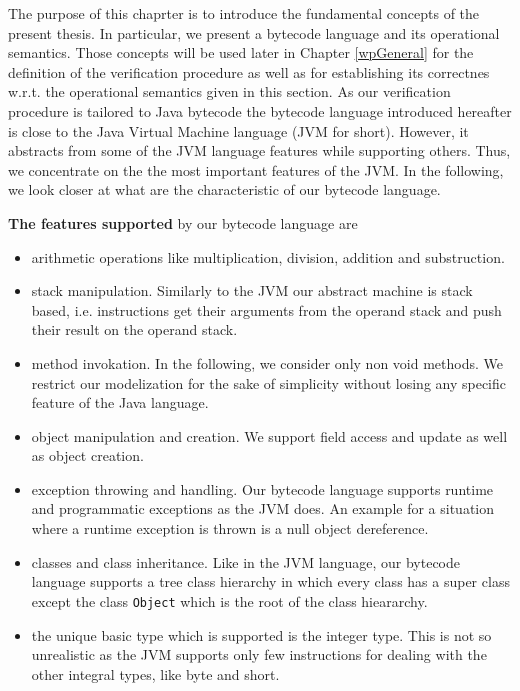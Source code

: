 
 The purpose of this chaprter is to introduce the fundamental concepts of the
 present thesis. In particular, we present a bytecode language 
 and its operational semantics. Those concepts will be used later in Chapter \ref{wpGeneral}
 for the definition of the verification
 procedure as well as for establishing 
 its correctnes w.r.t. the operational semantics
 given in this section. As our verification procedure is tailored to Java bytecode 
 the bytecode language introduced hereafter is close to the Java Virtual Machine 
 language \cite{VMSpec}(JVM for short). However, it abstracts from some of the JVM language
 features while supporting others. Thus, we concentrate on the 
the most important features of the JVM. In the following, we look closer at what are the characteristic of our bytecode language. 

\textbf{The features supported} by our bytecode language are 
\begin{itemize} 
   \item  arithmetic operations like multiplication, division, addition and substruction. 

   \item  stack manipulation. Similarly to the JVM  our abstract machine is stack based, i.e. instructions
          get their arguments from the operand stack and push their result on the  operand stack.

   \item  method invokation. In the following, we consider only  non void methods. 
          We restrict our modelization for the sake of simplicity without losing any specific feature of the Java language.
         
   \item  object manipulation and creation. We support field access and update as well as object creation. 

   \item  exception throwing and handling. Our bytecode language supports runtime and programmatic exceptions as the JVM does.
	  An example for a situation where a runtime exception is thrown is a null object dereference.  
   
   \item  classes and class inheritance. Like in the JVM language, our bytecode language supports  a tree class hierarchy in which every class 
          has a super class except the class \texttt{Object} which is the root of the class hieararchy.

   \item  the unique basic type which is supported is the integer type.
          This is not so unrealistic as the JVM supports only few instructions 
          for dealing with the other integral types, like byte and short.
	  
\end{itemize} 
 
